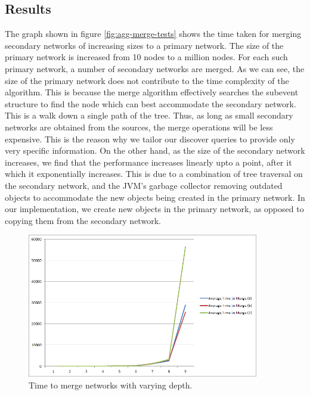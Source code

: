 \subsection{Results}
The graph shown in figure \ref{fig:agg-merge-tests} shows the time taken for merging secondary networks of increasing sizes to a primary network. The size of the primary network is increased from 10 nodes to a million nodes. For each such primary network, a number of secondary networks are merged. As we can see, the size of the primary network does not contribute to the time complexity of the algorithm. This is because the merge algorithm effectively searches the subevent structure to find the node which can best accommodate the secondary network. This is a walk down a single path of the tree. Thus, as long as small secondary networks are obtained from the sources, the merge operations will be less expensive. This is the reason why we tailor our discover queries to provide only very specific information. On the other hand, as the  size of the secondary network increases, we find that the performance increases linearly upto a point, after it which it exponentially increases. This is due to a combination of tree traversal on the secondary network, and the JVM's garbage collector removing outdated objects to accommodate the new objects being created in the primary network. In our implementation, we create new objects in the primary network, as opposed to copying them from the secondary network.

\begin{figure}[t]
\centering
\includegraphics[width=0.9\textwidth]{media/chapter5/perf/mergedepthtest.png}
\caption{Time to merge networks with varying depth.}
\label{fig:agg-depth}
\end{figure}

